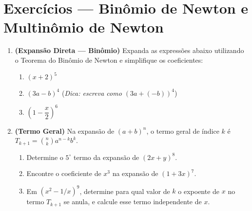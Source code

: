 \documentclass[12pt]{article}
\begin{document}
\vspace*{0.2cm}
\section*{Exercícios — Binômio de Newton e Multinômio de Newton}

\begin{enumerate}

\item \textbf{(Expansão Direta — Binômio)} Expanda as expressões abaixo utilizando o Teorema do Binômio de Newton e simplifique os coeficientes:
\begin{enumerate}[label=\alph*)]
    \item $(x + 2)^5$
    \item $(3a - b)^4$ \quad (\textit{Dica: escreva como $(3a + (-b))^4$})
    \item $\left(1 - \dfrac{x}{2}\right)^6$
\end{enumerate}

\vspace{0.2cm}
\begin{tcolorbox}[colback=white, colframe=maincolor, height=12cm, arc=2mm, boxrule=1pt]
\end{tcolorbox}



\item \textbf{(Termo Geral)} Na expansão de $(a+b)^n$, o termo geral de índice $k$ é $T_{k+1} = \binom{n}{k}a^{n-k}b^k$.
\begin{enumerate}[label=\alph*)]
    \item Determine o $5^\circ$ termo da expansão de $(2x + y)^8$.
    \item Encontre o coeficiente de $x^3$ na expansão de $(1 + 3x)^7$.
    \item Em $(x^2 - 1/x)^9$, determine para qual valor de $k$ o expoente de $x$ no termo $T_{k+1}$ se anula, e calcule esse termo independente de $x$.
\end{enumerate}

\vspace{0.2cm}
\begin{tcolorbox}[colback=white, colframe=maincolor, height=12cm, arc=2mm, boxrule=1pt]
\end{tcolorbox}


\end{enumerate}
\end{document}
